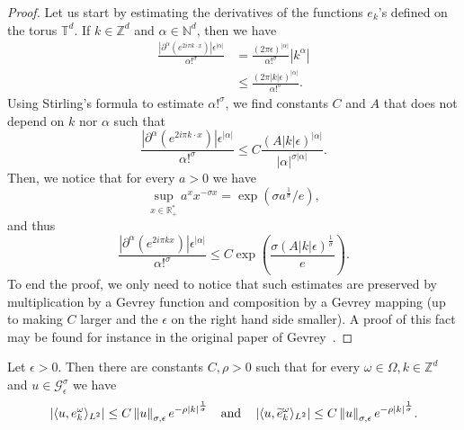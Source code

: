 \documentclass[AHL,Unicode,longabstracts,published]{cedram}
\newcommand{\p}[1]{\left(#1\right)}
\newcommand{\n}[1]{\left\|#1\right\|}
\newcommand{\va}[1]{\left|#1\right|}
\newcommand{\brac}[1]{\langle #1 \rangle}
\newcommand{\clG}{\mathcal{G}}
\newcommand{\bbZ}{\mathbb{Z}}
\newcommand{\bbT}{\mathbb{T}}
\newcommand{\bbN}{\mathbb{N}}
\newcommand{\bbR}{\mathbb{R}}
\let\oldtilde\tilde
\renewcommand*{\tilde}[1]{\mathchoice{\widetilde{#1}}{\widetilde{#1}}{\oldtilde{#1}}{\oldtilde{#1}}}
\begin{document}
\begin{proof}
Let us start by estimating the derivatives of the functions $e_k$'s defined on the torus $\bbT^d$. If $k \in \bbZ^d$ and $\alpha \in \bbN^d$, then we have
\begin{equation*}
\begin{split}
\frac{\va{\partial^\alpha \left(e^{2 i \pi k \cdot x}\right)}\epsilon^{\va{\alpha}}}{\alpha!^\sigma} & = \frac{(2 \pi \epsilon)^{\va{\alpha}}}{\alpha!^\sigma} |k^\alpha| \\
& \leq \frac{(2 \pi \va{k} \epsilon)^{\va{\alpha}}}{\alpha!^\sigma}.
\end{split}
\end{equation*}
Using Stirling's formula to estimate $\alpha!^\sigma$, we find constants $C$ and $A$ that does not depend on $k$ nor $\alpha$ such that
\begin{equation*}
\frac{\va{\partial^\alpha \left(e^{2 i \pi k \cdot x}\right)}\epsilon^{\va{\alpha}}}{\alpha!^\sigma} \leq C \frac{(A \va{k} \epsilon)^{\va{\alpha}}}{\va{\alpha}^{\sigma \va{\alpha}}}.
\end{equation*}
Then, we notice that for every $a > 0$ we have
\begin{equation*}
\sup_{x \in \bbR_+^*} a^x x^{- \sigma x} = \exp\p{\sigma a^{\frac{1}{\sigma}}/e},
\end{equation*}
and thus
\begin{equation*}
\frac{\va{\partial^\alpha \left(e^{2 i \pi k x}\right)}\epsilon^{\va{\alpha}}}{\alpha!^\sigma} \leq C \exp\p{\frac{\sigma (A \va{k} \epsilon)^{\frac{1}{\sigma}}}{e}}.
\end{equation*}
To end the proof, we only need to notice that such estimates are preserved by multiplication by a Gevrey function and composition by a Gevrey mapping (up to making $C$ larger and the $\epsilon$ on the right hand side smaller). A proof of this fact may be found for instance in the original paper of Gevrey~\cite{GevreyOG}.
\end{proof}

\begin{lemm}\label{lemma:dual_ekomega_gevrey}
Let $\epsilon > 0$. Then there are constants $C,\rho > 0$ such that for every $\omega \in \Omega, k \in \bbZ^d$ and $u \in \clG^\sigma_\epsilon$ we have
\begin{equation*}
\va{\brac{u,e_k^\omega}_{L^2}} \leq C \n{u}_{\sigma,\epsilon} e^{- \rho \va{k}^{\frac{1}{\sigma}}} \quad \text{and} \quad \va{\brac{u,\tilde{e}_k^\omega}_{L^2}} \leq C \n{u}_{\sigma,\epsilon} e^{- \rho \va{k}^{\frac{1}{\sigma}}}.
\end{equation*}
\end{lemm}
\end{document}
